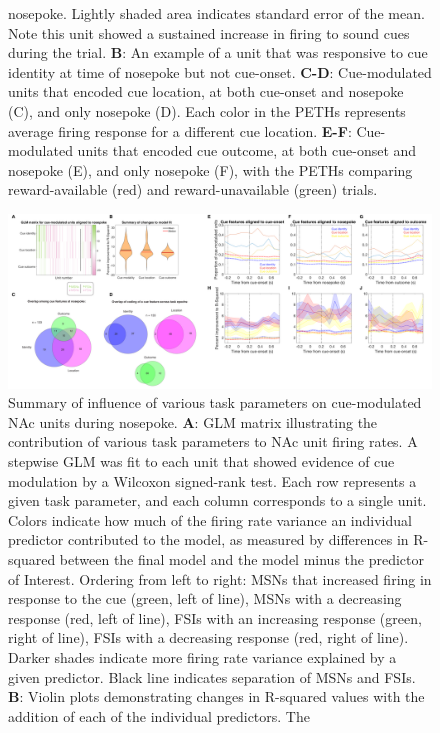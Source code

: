 \documentclass[11pt]{article}
\newcommand{\bsf}[1]{\textbf{#1}}
\begin{document}
\begin{figure}[ht!]
{nosepoke. Lightly shaded area indicates standard error of the mean. Note this
unit showed a sustained increase in firing to sound cues during the trial. \bsf{B}: An
example of a unit that was responsive to cue identity at time of nosepoke but
not cue-onset. \bsf{C-D}: Cue-modulated units that encoded cue location, at
both cue-onset and nosepoke (C), and only nosepoke (D). Each color in the
PETHs represents average firing response for a different cue
location. \bsf{E-F}: Cue-modulated units that encoded cue outcome, at both
cue-onset and nosepoke (E), and only nosepoke (F), with the PETHs comparing
reward-available (red) and reward-unavailable (green) trials.}
\label{fig:NP_examples}
\end{figure} \clearpage

 \begin{figure}[ht!]
\centering
\includegraphics[width=\textwidth]{Fig 10 - NP GLM.pdf}
\caption{Summary of influence of various task parameters on cue-modulated NAc
units during nosepoke. \bsf{A}: GLM matrix illustrating the contribution of various
task parameters to NAc unit firing rates. A stepwise GLM was fit to each unit that
showed evidence of cue modulation by a Wilcoxon signed-rank test. Each row
represents a given task parameter, and each column corresponds to a single unit. Colors indicate how much of the firing rate variance an
individual predictor contributed to the model, as measured by differences in
R-squared between the final model and the model minus the predictor of
Interest. Ordering from left to right: MSNs that increased firing
in response to the cue (green, left of line), MSNs with a decreasing response
(red, left of line), FSIs with an increasing response (green, right of line),
FSIs with a decreasing response (red, right of line). Darker shades indicate
more firing rate variance explained by a given predictor. Black line indicates
separation of MSNs and FSIs. \bsf{B}: Violin plots demonstrating changes in
R-squared values with the addition of each of the individual predictors. The
}
\end{figure}
\end{document}

